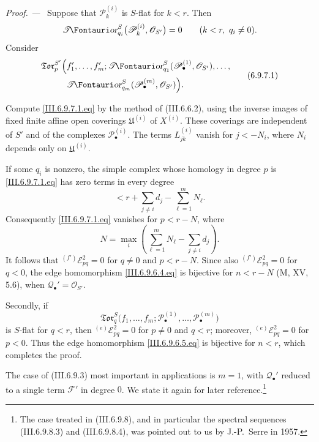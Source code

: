 \documentclass[10pt,oneside]{book}
\newcommand{\sh}[1]{\mathscr{#1}}
\newcommand{\shTor}{\sh{T}\textup{\kern-2.2pt{\Fontauri\slshape or}}}
\newcommand{\sref}[2][]{(#2)}
\newcommand{\oldpage}[2][]{\setcounter{footnote}{0}\marginpar{\scriptsize\textbf{#1}~|~#2}\ignorespaces}
\newenvironment{proof}{\par\medskip\noindent\textit{Proof. ---\ }}{\par}
\begin{document}
\begin{proof}
Suppose that $\sh P_k^{(i)}$ is $S$-flat for $k<r$.  Then
\[
  \shTor_{q_i}^S
  \bigl(
    \sh P_k^{(i)},\sh O_{S'}
  \bigr)
  =
  0
  \qquad
  (k<r,\ q_i\neq0).
\]
Consider
\[
\begin{split}
  \mathfrak{Tor}_p^{S'}
  \Bigl(
    &
    f_1',\ldots,f_m';
    \shTor_{q_1}^S
    (\sh P_\bullet^{(1)},\sh O_{S'}),\ldots,
    \\
    &
    \shTor_{q_m}^S
    (\sh P_\bullet^{(m)},\sh O_{S'})
  \Bigr).
\end{split}
  \tag{6.9.7.1}\label{III.6.9.7.1.eq}
\]

\oldpage[III]{170}

Compute \eqref{III.6.9.7.1.eq} by the method of
\sref{III.6.6.2}, using the inverse images of fixed finite affine
open coverings $\mathfrak U^{(i)}$ of $X^{(i)}$.  These coverings
are independent of $S'$ and of the complexes
$\sh P_\bullet^{(i)}$.  The terms $L_{jk}^{(i)}$ vanish for
$j<-N_i$, where $N_i$ depends only on $\mathfrak U^{(i)}$.

If some $q_i$ is nonzero, the simple complex whose homology in
degree $p$ is \eqref{III.6.9.7.1.eq} has zero terms in every degree
\[
  <
  r+\sum_{j\neq i}d_j-\sum_{\ell=1}^mN_\ell.
\]
Consequently \eqref{III.6.9.7.1.eq} vanishes for $p<r-N$, where
\[
  N
  =
  \max_i
  \left(
    \sum_{\ell=1}^mN_\ell-\sum_{j\neq i}d_j
  \right).
\]
It follows that
${}^{(f')}\sh E_{pq}^2=0$ for $q\neq0$ and $p<r-N$.
Since also ${}^{(f')}\sh E_{pq}^2=0$ for $q<0$, the edge
homomorphism \eqref{III.6.9.6.4.eq} is bijective for $n<r-N$
(M, XV, 5.6), when $\sh Q_\bullet'=\sh O_{S'}$.

Secondly, if
\[
  \mathfrak{Tor}_q^S
  \bigl(
    f_1,\ldots,f_m;
    \sh P_\bullet^{(1)},\ldots,\sh P_\bullet^{(m)}
  \bigr)
\]
is $S$-flat for $q<r$, then
${}^{(e)}\sh E_{pq}^2=0$ for $p\neq0$ and $q<r$; moreover,
${}^{(e)}\sh E_{pq}^2=0$ for $p<0$.  Thus the edge homomorphism
\eqref{III.6.9.6.5.eq} is bijective for $n<r$, which completes the
proof.
\end{proof}

The case of \sref{III.6.9.3} most important in applications is
$m=1$, with $\sh Q_\bullet'$ reduced to a single term $\sh F'$ in
degree $0$.  We state it again for later reference.\footnote{The
case treated in \sref{III.6.9.8}, and in particular the spectral
sequences \sref{III.6.9.8.3} and \sref{III.6.9.8.4}, was pointed
out to us by J.-P.~Serre in 1957.}
\end{document}
